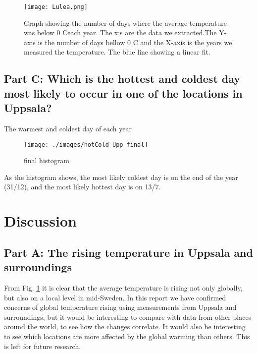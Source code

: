 \documentclass[a4paper]{article}
\begin{document}
\begin{figure}[H]
   \centering
  \texttt{[image: Lulea.png]}
    \caption{Graph showing the number of days where the average temperature was below 0 C\degree each year. The x;s are the data we extracted.The Y-axis is the number of days bellow 0 C \degree and the X-axis is the years we measured the temperature. The blue line showing a linear fit.}
   \label{fig:year}
\end{figure}

\subsection{Part C: Which is the hottest and coldest day most likely to occur in one of the locations in Uppsala?}

\item The warmest and coldest day of each year
\begin{figure}[H]
    \centering
    \texttt{[image: ./images/hotCold\_Upp\_final]}
    \caption{final histogram}
    \label{fig:hist}
\end{figure}
As the histogram shows, the most likely coldest day is on the end of the year (31/12), and the most likely hottest day is on 13/7.

\section{Discussion}\label{sec:discussion}
\subsection{Part A: The rising temperature in Uppsala and surroundings}
From Fig. \ref{fig:year} it is clear that the average temperature is rising not only globally, but also on a local level in mid-Sweden. In this report we have confirmed concerns of global temperature rising using measurements from Uppsala and surroundings, but it would be interesting to compare with data from other places around the world, to see how the changes correlate. It would also be interesting to see which locations are more affected by the global warming than others. This is left for future research.
\end{document}
